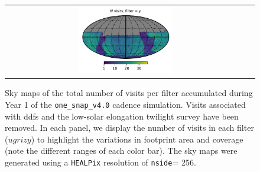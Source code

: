 \documentclass[preprintm,linenumbers]{aastex631}
\newcommand{\baseline}{\texttt{one\_snap\_v4.0}\xspace}
\newcommand{\nside}{\texttt{nside}\xspace}
\newcommand{\healpix}{\texttt{HEALPix}\xspace} %
\begin{document}
\begin{figure}
\begin{tabular}{c c}
			\includegraphics[width=0.4\textwidth]{results/skymaps/skymap_first_year_one_snap_v4_0_10yrs_db_noDD_noTwi_nside-256_CountMetric_y_noDD_noTwi.pdf} \\
		\end{tabular}
		\caption{ Sky maps of the total number of visits per filter accumulated during Year 1 of the \baseline cadence simulation. 
  Visits associated with \glspl*{ddf} and the low-solar elongation twilight survey have been removed.  
  In each panel, we display the number of visits in each filter ($ugrizy$) to highlight the variations in footprint area and coverage (note the different ranges of each color bar).  
  The sky maps were generated using a \healpix resolution of \nside = 256.  
		}
		\label{fig:baseline_skymaps}
	\end{figure}
\end{document}
